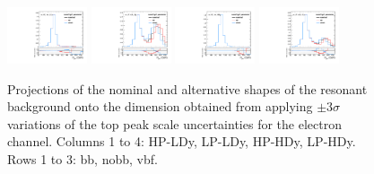 \begin{figure}[htbp]
  \includegraphics[width=0.21\textwidth]{fig/uncertainties/systs_res_e_HP_vbf_LDy_scaleTopY_ProjY.pdf}
  \includegraphics[width=0.21\textwidth]{fig/uncertainties/systs_res_e_LP_vbf_LDy_scaleTopY_ProjY.pdf}
  \includegraphics[width=0.21\textwidth]{fig/uncertainties/systs_res_e_HP_vbf_HDy_scaleTopY_ProjY.pdf}
  \includegraphics[width=0.21\textwidth]{fig/uncertainties/systs_res_e_LP_vbf_HDy_scaleTopY_ProjY.pdf}\\
  \caption{
    Projections of the nominal and alternative shapes of the resonant background onto the \MJ dimension obtained from applying $\pm3\sigma$ variations of the top peak scale uncertainties for the electron channel.
    Columns 1 to 4: HP-LDy, LP-LDy, HP-HDy, LP-HDy.
    Rows 1 to 3: bb, nobb, vbf.
  }
  \label{fig:systResMJ_scaleTopY}
\end{figure}

